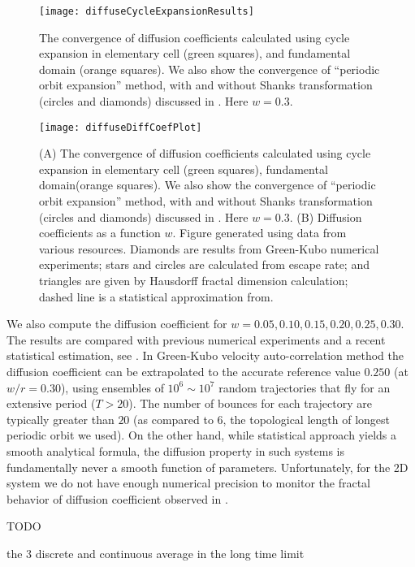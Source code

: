 \begin{figure}
	\texttt{[image: diffuseCycleExpansionResults]}
	\caption{\label{fig-convergence}The convergence of diffusion 
	coefficients  calculated using cycle		
		expansion in elementary cell (green squares), and fundamental 
		domain (orange squares). We also show the convergence of 
		``periodic orbit expansion'' method, with and  without Shanks 
		transformation (circles and diamonds) discussed in  
		. Here $w = 0.3$.
		}
\end{figure}
\begin{figure}
	\texttt{[image: diffuseDiffCoefPlot]}
	\caption[Diffusion coefficients computed using cycle expansion 
	formulas]{\label{fig-results} 
		(A) The convergence of diffusion coefficients  calculated 
		using cycle
		expansion in elementary cell (green squares),  fundamental
		domain(orange squares). We  also show the convergence of 
		``periodic
		orbit expansion'' method, with and  without Shanks 
		transformation
		(circles and diamonds) discussed in  . 
		Here $w =
		0.3$. (B) Diffusion coefficients as a function $w$.  Figure
		generated using data from various resources. Diamonds are 
		results
		from  Green-Kubo numerical experiments;
		stars and  circles are calculated 
		from
		escape rate; and triangles are  given by Hausdorff fractal 
		dimension
		calculation; dashed line  is a statistical
		approximation from.}
\end{figure}

We also compute the diffusion coefficient for $w = 0.05, 0.10, 0.15,
0.20, 0.25, 0.30$. The results are compared with previous numerical
experiments and a recent statistical estimation, see
. In Green-Kubo velocity auto-correlation method
the  diffusion coefficient can be extrapolated to the accurate
reference value $0.250$ (at $w/r=0.30$), using ensembles of
$10^6\sim10^7$ random trajectories that fly for an extensive period
($T > 20$). The number of bounces for each trajectory are
typically greater than $20$ (as compared to 6, the topological length
of longest periodic orbit we used). On the other hand, while
statistical approach yields a smooth analytical formula,
the diffusion property in such systems is fundamentally never a 
smooth function of parameters. Unfortunately, for 
the 2D system we do not have enough numerical precision to monitor 
the fractal behavior of diffusion coefficient observed in 
. 

TODO

the 3 discrete and continuous average in the long time limit
